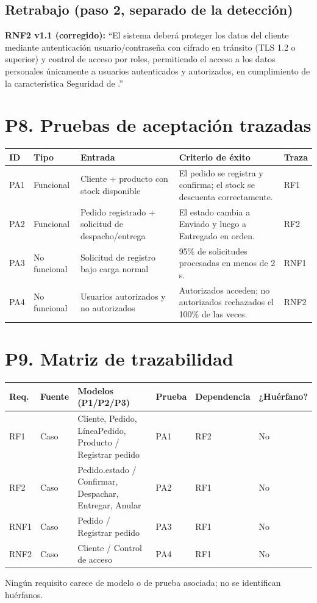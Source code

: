 \documentclass[11pt,a4paper]{article}
\begin{document}
	\subsection*{Retrabajo (paso 2, separado de la detección)}
	\textbf{RNF2 v1.1 (corregido):} ``El sistema deberá proteger los datos del cliente mediante
	autenticación usuario/contraseña con cifrado en tránsito (TLS 1.2 o superior) y control de acceso por
	roles, permitiendo el acceso a los datos personales únicamente a usuarios autenticados y
	autorizados, en cumplimiento de la característica Seguridad de \citep{iso25010}.''
	
	\section{P8. Pruebas de aceptación trazadas}
	\begin{center}
		\begin{tabularx}{\linewidth}{@{}llXXl@{}}
			\toprule
			ID & Tipo & Entrada & Criterio de éxito & Traza \\
			\midrule
			PA1 & Funcional & Cliente + producto con stock disponible & El pedido se registra y confirma; el stock se descuenta correctamente. & RF1 \\
			PA2 & Funcional & Pedido registrado + solicitud de despacho/entrega & El estado cambia a Enviado y luego a Entregado en orden. & RF2 \\
			PA3 & No funcional & Solicitud de registro bajo carga normal & 95\% de solicitudes procesadas en menos de 2 s. & RNF1 \\
			PA4 & No funcional & Usuarios autorizados y no autorizados & Autorizados acceden; no autorizados rechazados el 100\% de las veces. & RNF2 \\
			\bottomrule
		\end{tabularx}
	\end{center}
	
	\section{P9. Matriz de trazabilidad}

	\begin{center}
		\begin{tabularx}{\linewidth}{@{}llXXll@{}}
			\toprule
			Req. & Fuente & Modelos (P1/P2/P3) & Prueba & Dependencia & ¿Huérfano? \\
			\midrule
			RF1 & Caso & Cliente, Pedido, LíneaPedido, Producto / Registrar pedido & PA1 & RF2 & No \\
			RF2 & Caso & Pedido.estado / Confirmar, Despachar, Entregar, Anular & PA2 & RF1 & No \\
			RNF1 & Caso & Pedido / Registrar pedido & PA3 & RF1 & No \\
			RNF2 & Caso & Cliente / Control de acceso & PA4 & RF1 & No \\
			\bottomrule
		\end{tabularx}
	\end{center}
	Ningún requisito carece de modelo o de prueba asociada; no se identifican huérfanos.
	
\end{document}
